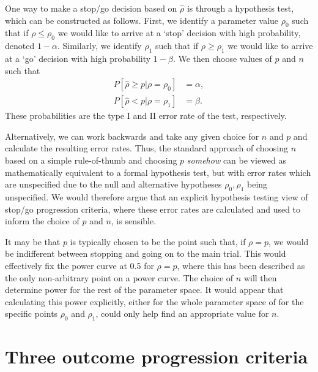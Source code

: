 \documentclass[sagev, Crown]{sagej} %
\begin{document}
One way to make a stop/go decision based on $\hat{\rho}$ is through a hypothesis test, which can be constructed as follows. First, we identify a parameter value $\rho_0$ such that if $\rho \leq \rho_0$ we would like to arrive at a `stop' decision with high probability, denoted $1 - \alpha$. Similarly, we identify $\rho_1$ such that if $\rho \geq \rho_1$ we would like to arrive at a `go' decision with high probability $1 - \beta$. We then choose values of $p$ and $n$ such that
\begin{align}
P[ \hat{\rho} \geq p | \rho = \rho_0] & = \alpha, \\
P[ \hat{\rho} < p | \rho = \rho_1] & = \beta.
\end{align}
These probabilities are the type I and II error rate of the test, respectively.

Alternatively, we can work backwards and take any given choice for $n$ and $p$ and calculate the resulting error rates. Thus, the standard approach of choosing $n$ based on a simple rule-of-thumb and choosing $p$ \emph{somehow} can be viewed as mathematically equivalent to a formal hypothesis test, but with error rates which are unspecified due to the null and alternative hypotheses $\rho_0, \rho_1$ being unspecified. We would therefore argue that an explicit hypothesis testing view of stop/go progression criteria, where these error rates are calculated and used to inform the choice of $p$ and $n$, is sensible.

It may be that $p$ is typically chosen to be the point such that, if $\rho = p$, we would be indifferent between stopping and going on to the main trial. This would effectively fix the power curve at 0.5 for $\rho = p$, where this has been described as the only non-arbitrary point on a power curve. The choice of $n$ will then determine power for the rest of the parameter space. It would appear that calculating this power explicitly, either for the whole parameter space of for the specific points $\rho_0$ and $\rho_1$, could only help find an appropriate value for $n$.


\section{Three outcome progression criteria}
\end{document}
